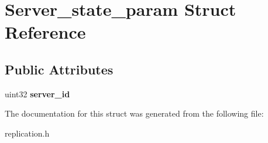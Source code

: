 \hypertarget{structServer__state__param}{}\section{Server\+\_\+state\+\_\+param Struct Reference}
\label{structServer__state__param}
\subsection*{Public Attributes}
\begin{DoxyCompactItemize}
\item 
\mbox{\label{structServer__state__param_a4a97400dfbe3fea8da05b80f09c5f1d1}} 
uint32 {\bfseries server\+\_\+id}
\end{DoxyCompactItemize}


The documentation for this struct was generated from the following file\+:\begin{DoxyCompactItemize}
\item 
replication.\+h\end{DoxyCompactItemize}
